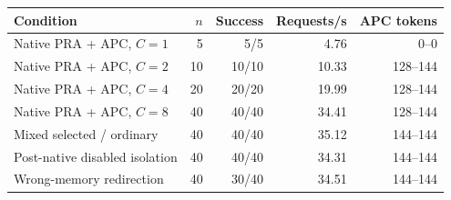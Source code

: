 \begin{tabular}{lrrrr}
\toprule
Condition & $n$ & Success & Requests/s & APC tokens \\
\midrule
Native PRA + APC, $C=1$ & 5 & 5/5 & 4.76 & 0--0 \\
Native PRA + APC, $C=2$ & 10 & 10/10 & 10.33 & 128--144 \\
Native PRA + APC, $C=4$ & 20 & 20/20 & 19.99 & 128--144 \\
Native PRA + APC, $C=8$ & 40 & 40/40 & 34.41 & 128--144 \\
Mixed selected / ordinary & 40 & 40/40 & 35.12 & 144--144 \\
Post-native disabled isolation & 40 & 40/40 & 34.31 & 144--144 \\
Wrong-memory redirection & 40 & 30/40 & 34.51 & 144--144 \\
\bottomrule
\end{tabular}
